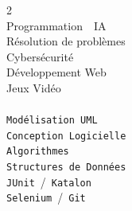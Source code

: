 \documentclass[lighthipster]{simplehipstercv}
\begin{document}
\begin{paracol}{2}
{\\[0.5em]
Programmation~\textbullet~IA\\[0.3em]
Résolution de problèmes\\[0.3em]
Cybersécurité\\[0.3em]
Développement Web\\[0.3em]
Jeux Vidéo\\[0.8em]

\\[0.5em]
\texttt{Modélisation UML}\\[0.3em]
\texttt{Conception Logicielle}\\[0.3em]
\texttt{Algorithmes}\\[0.3em]
\texttt{Structures de Données}\\[0.3em]
\texttt{JUnit}~/~\texttt{Katalon}\\[0.3em]
\texttt{Selenium}~/~\texttt{Git}\\[0.3em]
}

\switchcolumn
\small


\end{paracol}
\end{document}
